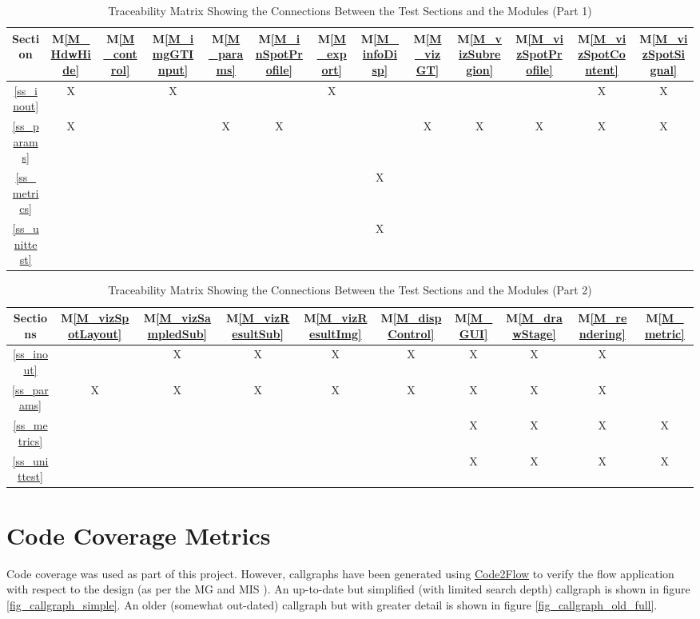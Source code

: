 \documentclass[12pt, titlepage]{article}
\newcommand{\mref}[1]{M\ref{#1}}
\begin{document}
\begin{table}[h]
  \centering
  \begin{tabular}{|c|c|c|c|c|c|c|c|c|c|c|c|c|}
      \hline
      Section &
      \mref{M_HdwHide} &
      \mref{M_control} &
      \mref{M_imgGTInput} &
      \mref{M_params} &
      \mref{M_inSpotProfile} &
      \mref{M_export} &
      \mref{M_infoDisp} &
      \mref{M_vizGT} &
      \mref{M_vizSubregion} &
      \mref{M_vizSpotProfile} &
      \mref{M_vizSpotContent} &
      \mref{M_vizSpotSignal}
      \\
      \hline
       \ref{ss_inout}     &X& &X& & &X& & & & &X&X\\ \hline
       \ref{ss_params}    &X& & &X&X& & &X&X&X&X&X\\ \hline
       \ref{ss_metrics}   & & & & & & &X& & & & & \\ \hline
       \ref{ss_unittest}  & & & & & & &X& & & & & \\ \hline
  \end{tabular}
  \caption{Traceability Matrix Showing the Connections Between the Test Sections
    and the Modules (Part 1)}
  \label{Table:M_trace}
\end{table}

\begin{table}[h]
  \centering
  \begin{tabular}{|c|c|c|c|c|c|c|c|c|c|}
      \hline
      Sections &
      \mref{M_vizSpotLayout} &
      \mref{M_vizSampledSub} &
      \mref{M_vizResultSub} &
      \mref{M_vizResultImg} &
      \mref{M_dispControl} &
      \mref{M_GUI} &
      \mref{M_drawStage} &
      \mref{M_rendering} &
      \mref{M_metric}
      \\
      \hline
       \ref{ss_inout}     & &X&X&X&X&X&X&X& \\ \hline
       \ref{ss_params}    &X&X&X&X&X&X&X&X& \\ \hline
       \ref{ss_metrics}   & & & & & &X&X&X&X\\ \hline
       \ref{ss_unittest}  & & & & & &X&X&X&X\\ \hline
  \end{tabular}
  \caption{Traceability Matrix Showing the Connections Between the Test Sections
    and the Modules (Part 2)}
  \label{Table:M_trace2}
\end{table}


\section{Code Coverage Metrics}
Code coverage was used as part of this project. However, callgraphs have been generated using
\href{https://github.com/scottrogowski/code2flow}{Code2Flow}
to verify the flow application with respect to the design (as per the MG \cite{MG} and MIS \cite{MIS}).
An up-to-date but simplified (with limited search depth) callgraph is shown in figure \ref{fig_callgraph_simple}.
An older (somewhat out-dated) callgraph but with greater detail is shown in figure \ref{fig_callgraph_old_full}.
\end{document}
